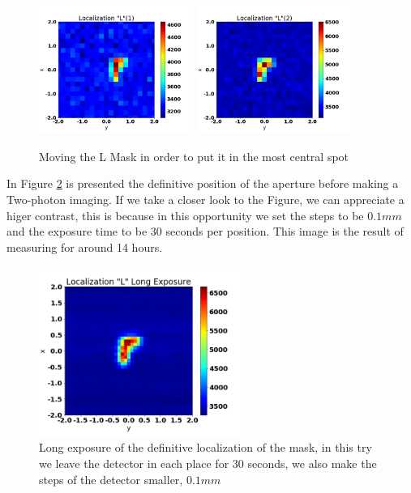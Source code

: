 \begin{figure}[h!]
\centering
{  \includegraphics[width=0.45\textwidth]{Figures/localizationL1.png} }
{  \includegraphics[width=0.45\textwidth]{Figures/localizationL2.png} }
\caption{Moving the L Mask in order to put it in the most central spot}
 \label{fig:localizationL}
\end{figure}
In Figure \ref{fig:localizationDef} is presented the definitive position of the aperture
before making a Two-photon imaging. If we take a closer look to the Figure, we can appreciate
a higer contrast, this is because in this opportunity we set the steps to be $0.1mm$ and 
the exposure time to be 30 seconds per position. This image is the result of measuring for around 
14 hours.
\begin{figure}[h!]
\centering
\includegraphics[width=0.6\textwidth]{Figures/localizationLLong.png} 
\caption{Long exposure of the definitive localization of the mask, in this try we leave the 
detector in each place for 30 seconds, we also make the steps of the detector smaller, $0.1mm$}
\label{fig:localizationDef}
\end{figure}

